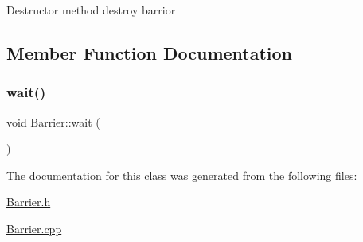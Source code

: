 Destructor method destroy barrior 

\subsection{Member Function Documentation}
\mbox{\label{class_barrier_a83a9d2e85e98b3d2081538bf0da29b60}} 
\subsubsection{\texorpdfstring{wait()}{wait()}}
{\footnotesize\ttfamily void Barrier\+::wait (\begin{DoxyParamCaption}{ }\end{DoxyParamCaption})}



The documentation for this class was generated from the following files\+:\begin{DoxyCompactItemize}
\item 
\hyperlink{_barrier_8h}{Barrier.\+h}\item 
\hyperlink{_barrier_8cpp}{Barrier.\+cpp}\end{DoxyCompactItemize}
